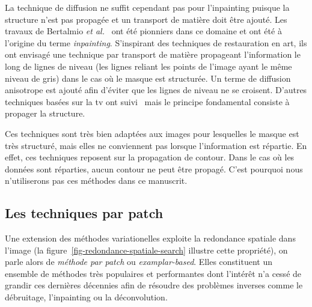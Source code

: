 La technique de diffusion ne suffit cependant pas pour l'inpainting puisque la structure n'est pas propagée et un transport de matière doit être ajouté. Les travaux de Bertalmio \textit{et al.}~\cite{bertalmio2000image} ont été pionniers dans ce domaine et ont été à l'origine du terme \emph{inpainting}. S'inspirant des techniques de restauration en art, ils ont envisagé une technique par transport de matière propageant l'information le long de lignes de niveau (les lignes reliant les points de l'image ayant le même niveau de gris) dans le cas où le masque est structurée. Un terme de diffusion anisotrope est ajouté afin d'éviter que les lignes de niveau ne se croisent. D'autres techniques basées sur la \gls{tv} ont suivi~\cite{shen2002mathematical, chan2001nontexture} mais le principe fondamental consiste à propager la structure.

Ces techniques sont très bien adaptées aux images pour lesquelles le masque est très structuré, mais elles ne conviennent pas lorsque l'information est répartie. En effet, ces techniques reposent sur la propagation de contour. Dans le cas où les données sont réparties, aucun contour ne peut être propagé. C'est pourquoi nous n'utiliserons pas ces méthodes dans ce manuscrit.


\subsection{Les techniques par patch}\label{sec-art-patch}

Une extension des méthodes variationelles exploite la redondance spatiale dans l'image (la figure~\ref{fig-redondance-spatiale-search} illustre cette propriété), on parle alors de \emph{méthode par patch} ou \emph{examplar-based}. Elles constituent un ensemble de méthodes très populaires et performantes dont l'intérêt n'a cessé de grandir ces dernières décennies afin de résoudre des problèmes inverses comme le débruitage, l'inpainting ou la déconvolution.

